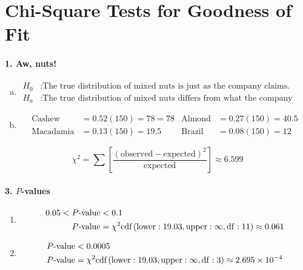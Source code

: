 \documentclass[../Homework]{subfiles}
\begin{document}
	\section{Chi-Square Tests for Goodness of Fit}
		\paragraph{1. Aw, nuts!}
			\begin{enumerate}[a.]
				\item
					\begin{align*}
						H_0&: \text{The true distribution of mixed nuts is just as the company claims.} \\
						H_a&: \text{The true distribution of mixed nuts differs from what the company claims.}
					\end{align*}
				\item
					\begin{align*}
						\text{Cashew} &= 0.52(150) = 78 = 78 & \text{Almond} &= 0.27(150) = 40.5 \\
						\text{Macadamia} &= 0.13(150) = 19.5 & \text{Brazil} &= 0.08(150) = 12
					\end{align*}
			\end{enumerate}
				\[\chi^2 = \sum\left[\mathrm{\frac{(observed - expected)^2}{expected}}\right] \approx 6.599\]
		\paragraph{3. $P$-values}
			\begin{enumerate}
				\item
					\begin{align*}
						0.05 < P\text{-value} &< 0.1 \\
						P\text{-value} &= \chi^2\text{cdf}\left(\operatorname{lower}: 19.03, \operatorname{upper}: \infty, \operatorname{df}: 11\right) \approx 0.061
					\end{align*}
				\item
					\begin{align*}
						P\text{-value} &< 0.0005 \\
						P\text{-value} &= \chi^2\text{cdf}\left(\operatorname{lower}: 19.03, \operatorname{upper}: \infty, \operatorname{df}: 3\right) \approx 2.695 \times 10^{-4}
					\end{align*}
			\end{enumerate}
\end{document}
